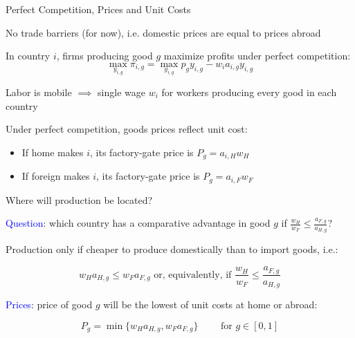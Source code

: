 \documentclass[notes,11pt, aspectratio=169, xcolor=table]{beamer}
\newcommand{\blue}[1]{\textcolor{blue}{#1}}
\newenvironment{wideitemize}{\itemize\addtolength{\itemsep}{10pt}}{\enditemize}
\begin{document}
\begin{frame}{Perfect Competition, Prices and Unit Costs}
\begin{wideitemize}
        \item<1-> No trade barriers (for now), i.e. domestic prices are equal to prices abroad
        \item In country $i$, firms producing good $g$ maximize profits under perfect competition:
        \begin{equation*}
            \max_{y_{i,g}} \pi_{i,g} = \max_{y_{i,g}} p_{g} y_{i,g} - w_i a_{i,g} y_{i,g} 
        \end{equation*}

        \item<2-> Labor is mobile $\implies$ single wage $w_i$ for workers producing every good in each country 

        \item<3-> Under perfect competition, goods prices reflect unit cost:
        \begin{itemize}
            \item If home makes $i$, its factory-gate price is $P_g = a_{i,H} w_{H}$
            \item If foreign makes $i$, its factory-gate price is $P_g = a_{i,F} w_{F}$
        \end{itemize}
        \end{wideitemize}
\end{frame}

\begin{frame}{Where will production be located?}
\begin{wideitemize}
    \item<1-> \blue{Question}: which country has a comparative advantage in good $g$ if $\frac{w_H}{w_F} \le  \frac{a_{F,g}}{a_{H,g}}$?

    \item<2-> Production only if cheaper to produce domestically than to import goods, i.e.:

    \begin{equation*}
        w_H a_{H,g} \le w_F a_{F,g} \text{ or, equivalently, if } \frac{w_H}{w_F} \le  \frac{a_{F,g}}{a_{H,g}}
    \end{equation*}

    \item<3-> \blue{Prices}: price of good $g$ will be the lowest of unit costs at home or abroad:


        \begin{equation*}
            P_{g} = \min\{w_H a_{H,g}, w_F a_{F,g}\}  \qquad \text{ for } g \in [0,1]
        \end{equation*}
        
        \end{wideitemize}
\end{frame}
\end{document}
